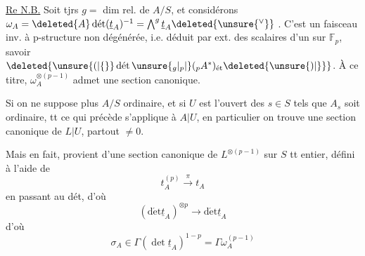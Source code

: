 \uline{Re N.B.} Soit tjrs $g=$ dim rel. de $A/S$, et considérons
$\omega_A=\deleted{A}\operatorname{d\acute et}(\underline t_A)^{-1}
=\bigwedge^g\underline t_A\deleted{\unsure{{}^\vee}}$
.
C'est un faisceau inv.
à p-structure non dégénérée, i.e. déduit par
ext. des scalaires d'un 
  sur $\mathbb F_p$, savoir
$\deleted{\unsure{(|\{}}\operatorname{d\acute et}\unsure{{}_g|{}_p|{}}({}_pA^*)_{\mathrm{\acute et}}\deleted{\unsure{)|\}}}$.
À ce titre, $\omega_A^{\otimes(p-1)}$ admet une section canonique.

Si on ne suppose plus  $A/S$ ordinaire, et si $U$ est l'ouvert des $s\in S$
tels que $A_s$ soit ordinaire, tt ce qui
précède s'applique à $A|U$, en particulier
on trouve une section canonique \inserted{$\sigma$} de
$L|U$, partout $\ne0$. 

Mais en fait,  provient d'une section
canonique de $L^{\otimes(p-1)}$ sur $S$ tt entier, défini
à l'aide de
\[
t_A^{(p)}\xrightarrow{\pi}t_A
\]
en passant au dét, d'où
\[
(\operatorname{d\acute et}\underline t_A)^{\otimes p}\longrightarrow\operatorname{d\acute et}\underline t_A
\]
d'où
\[
\sigma_A\in\Gamma(\operatorname{det}\underline t_A)^{1-p}=\Gamma\omega_A^{(p-1)}
\]
